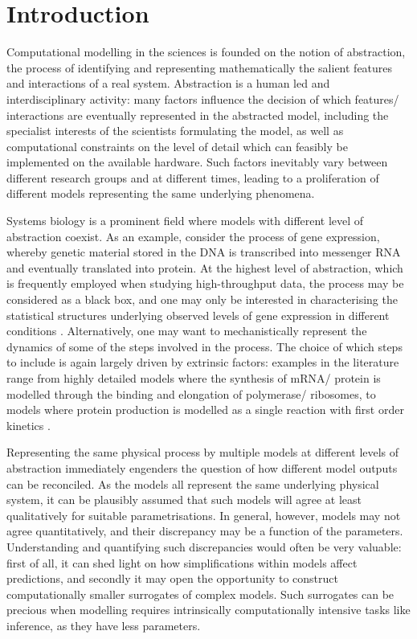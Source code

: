 \documentclass[runningheads,a4paper]{llncs}
\begin{document}
\section{Introduction} 

Computational modelling in the sciences is founded on the notion of abstraction, the process of identifying and representing mathematically the salient features and interactions of a real system. Abstraction is a human led and interdisciplinary activity: many factors influence the decision of which features/ interactions are eventually represented in the abstracted model, including the specialist interests of the scientists formulating the model, as well as computational constraints on the level of detail which can feasibly be implemented on the available hardware. Such factors inevitably vary between different research groups and at different times, leading to a proliferation of different models representing the same underlying phenomena.

Systems biology is a prominent field where models with different level of abstraction coexist. As an example, consider the process of gene expression, whereby genetic material stored in the DNA is transcribed into messenger RNA and eventually translated into protein. At the highest level of abstraction, which is frequently employed when studying high-throughput data, the process may be considered as a black box, and one may only be interested in characterising the statistical structures underlying observed levels of gene expression in different conditions \cite{hoyle2002making}. Alternatively, one may want to mechanistically represent the dynamics of some of the steps involved in the process. The choice of which steps to include is again largely driven by extrinsic factors: examples in the literature range from highly detailed models where the synthesis of mRNA/ protein is modelled through the binding and elongation of polymerase/ ribosomes, to models where protein production is modelled as a single reaction with first order kinetics \cite{aitken2013rule,lawrence2006modeling}.

Representing the same physical process by multiple models at different levels of abstraction immediately engenders the question of how different model outputs can be reconciled. As the models all represent the same underlying physical system, it can be plausibly assumed that such models will agree at least qualitatively for suitable parametrisations. In general, however, models may not agree quantitatively, and their discrepancy may be a function of the parameters. Understanding and quantifying such discrepancies would often be very valuable: first of all, it can shed light on how simplifications within models affect predictions, and secondly it may open the opportunity to construct computationally smaller  surrogates of complex models. Such surrogates can be precious when modelling requires intrinsically computationally intensive tasks like  inference, as they have less parameters.
\end{document}

